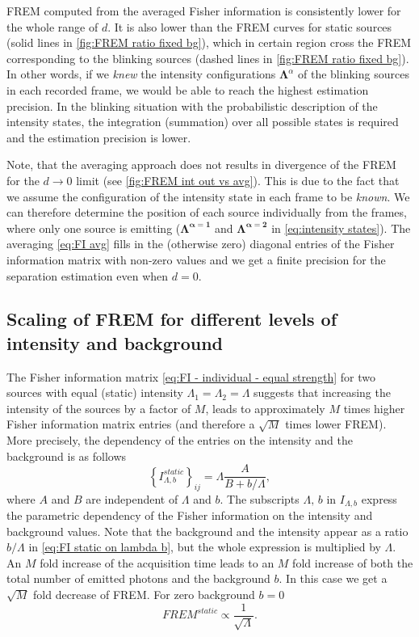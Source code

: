 FREM computed from the averaged Fisher information is consistently lower for the whole range of $d$. It is also lower than the FREM curves for static sources (solid lines in \autoref{fig:FREM ratio fixed bg}), which in certain region cross the FREM corresponding to the blinking sources (dashed lines in \autoref{fig:FREM ratio fixed bg}). In other words, if we {\it knew} the intensity configurations $\bm{\Lambda}^{\alpha}$ of the blinking sources in each recorded frame, we would be able to reach the highest estimation precision. In the blinking situation with the probabilistic description of the intensity states, the integration (summation) over all possible states is required and the estimation precision is lower. 

Note, that the averaging approach does not results in divergence of the FREM for the $d\rightarrow 0$ limit (see \autoref{fig:FREM int out vs avg}\aaa). This is due to the fact that we assume the configuration of the intensity state in each frame to be {\it known}. We can therefore determine the position of each source individually from the frames, where only one source is emitting ($\bm{\Lambda^{\alpha=1}}$ and $\bm{\Lambda^{\alpha=2}}$ in \autoref{eq:intensity states}). The averaging \autoref{eq:FI avg} fills in the (otherwise zero) diagonal entries of the Fisher information matrix with non-zero values and we get a finite precision for the separation estimation even when $d=0$.


\subsection{Scaling of FREM for different levels of intensity and background\label{sub:scaling}}

The Fisher information matrix \autoref{eq:FI - individual - equal strength} for two sources with equal (static) intensity $\Lambda_1=\Lambda_2=\Lambda$ suggests that increasing the intensity of the sources by a factor of $M$, leads to approximately $M$ times higher Fisher information matrix entries (and therefore a $\sqrt{M}$ times lower FREM). More precisely, the dependency of the entries on the intensity and the background is as follows
%
\begin{equation}
	\left\{I_{\Lambda,b}^{static}\right\}_{ij}=\Lambda\frac{A}{B+b/\Lambda},
	\label{eq:FI static on lambda b}
\end{equation}
%
where $A$ and $B$ are independent of $\Lambda$ and $b$. The subscripts $\Lambda,\,b$ in $I_{\Lambda,b}$ express the parametric dependency of the Fisher information on the intensity and background values.  Note that the background and the intensity appear as a ratio $b/\Lambda$ in \autoref{eq:FI static on lambda b}, but the whole expression is multiplied by $\Lambda$. An $M$ fold increase of the acquisition time leads to an $M$ fold increase of both the total number of emitted photons and the background $b$. In this case we get a $\sqrt{M}$ fold decrease of FREM. For zero background $b=0$ 
%
\begin{equation}
	\unit{FREM}^{static}\propto\frac{1}{\sqrt{\Lambda}}.
\end{equation}

